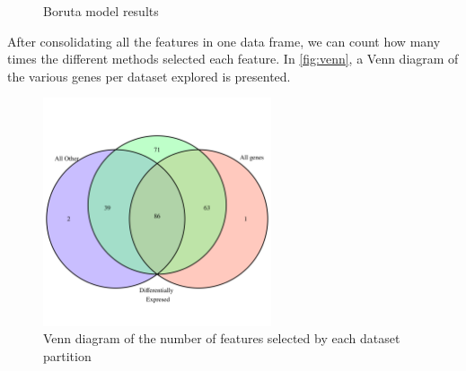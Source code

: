 \documentclass[11pt,twoside]{article}
\numberwithin{Theorem}{section}
\numberwithin{Definition}{section}
\numberwithin{Lemma}{section}
\numberwithin{Algorithm}{section}
\numberwithin{equation}{section}
\begin{document}
\begin{figure}[h]
    \centering
    \caption{Boruta model results}
    \label{fig:boruta}
\end{figure}

After consolidating all the features in one data frame, we can count how many times the different methods selected each feature. In \autoref{fig:venn}, a Venn diagram of the various genes per dataset explored is presented. 

\vspace*{1em}
\begin{figure}[!h]
\centering
\includegraphics[width=0.6\textwidth]{./output/venn.png}
\caption{Venn diagram of the number of features selected by each dataset partition}
\label{fig:venn}
\end{figure}
\vspace{2em}
\end{document}
